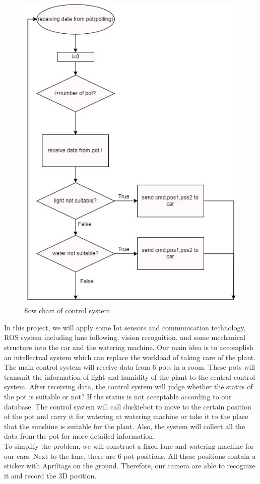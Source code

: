 \documentclass[a4paper, 10pt, conference]{ieeeconf}      %
\begin{document}
\begin{figure}[htbp] %
\includegraphics[width=0.8\columnwidth]{CmdServer_flowchart.jpg}
\centering
\caption{flow chart of control system}
\end{figure}

\hspace*{4mm}In this project, we will apply some Iot sensors and communication technology, ROS system including lane following, vision recognition, and some mechanical structure into the car and the watering machine. Our main idea is to accomplish an intellectual system which can replace the workload of taking care of the plant. The main control system will receive data from 6 pots in a room. These pots will transmit the information of light and humidity of the plant to the central control system. After receiving data, the control system will judge whether the status of the pot is suitable or not? If the status is not acceptable according to our database. The control system will call duckiebot to move to the certain position of the pot and carry it for watering at watering machine or take it to the place that the sunshine is suitable for the plant. Also, the system will collect all the data from the pot for more detailed information. \\
\hspace*{4mm}To simplify the problem, we will construct a fixed lane and watering machine for our cars. Next to the lane, there are 6 pot positions. All these positions contain a sticker with Apriltags on the ground. Therefore, our camera are able to recognize it and record the 3D position. \\
\end{document}
